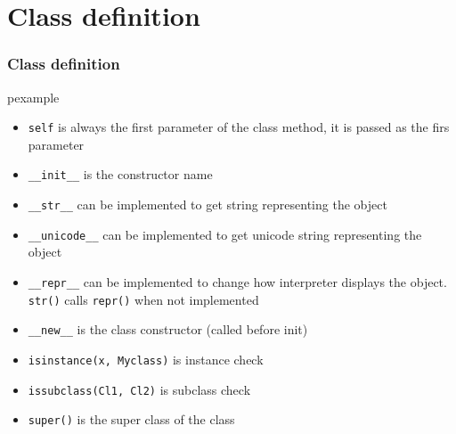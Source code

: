 \documentclass[trans,compress,xcolor=table]{beamer}
\begin{document}
\section{Class definition}
\begin{frame}
\frametitle{Class definition}
\begin{beamercolorbox}{pexample}
\codeclass
\end{beamercolorbox}
\end{frame}
\begin{frame}
\begin{itemize}
\item \lstinline!self! is always the first parameter of the class method, it is
     passed as the firs parameter
\item \lstinline!__init__! is the constructor name
\item \lstinline!__str__! can be implemented to get string representing the object
\item \lstinline!__unicode__! can be implemented to get unicode string representing the object
\item \lstinline!__repr__! can be implemented to change how interpreter displays the object. 
	\lstinline!str()! calls \lstinline!repr()! when not implemented
\item \lstinline!__new__! is the class constructor (called before init)
\item \lstinline!isinstance(x, Myclass)! is instance check
\item \lstinline!issubclass(Cl1, Cl2)! is subclass check
\item \lstinline!super()! is the super class of the class
\end{itemize}
\end{frame}
\end{document}
